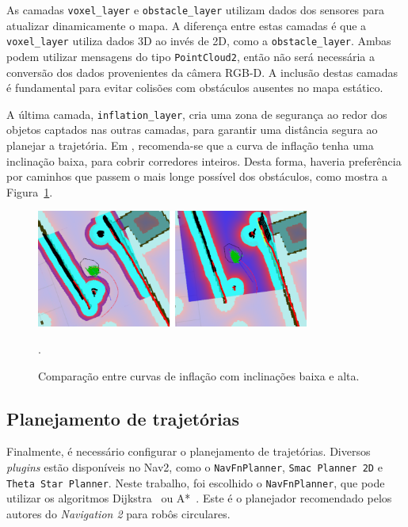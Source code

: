 \documentclass[repeatfields,xlists,xpacks,oneside,yearsonly]{ufrgscca}
\begin{document}
As camadas \texttt{voxel\_layer} e \texttt{obstacle\_layer} utilizam dados dos
sensores para atualizar dinamicamente o mapa.
A diferença entre estas camadas é que a \texttt{voxel\_layer} utiliza dados 3D
ao invés de 2D, como a \texttt{obstacle\_layer}. Ambas podem utilizar mensagens
do tipo \texttt{PointCloud2}, então não será necessária a conversão dos
dados provenientes da câmera RGB-D.
A inclusão destas camadas é fundamental para evitar colisões com obstáculos
ausentes no mapa estático.

A última camada, \texttt{inflation\_layer}, cria uma zona de segurança ao redor
dos objetos captados nas outras camadas, para garantir uma distância segura
ao planejar a trajetória.
Em \textcite{ros_tuning_guide}, recomenda-se que a curva de inflação tenha uma
inclinação baixa, para cobrir corredores inteiros.
Desta forma, haveria preferência por caminhos que passem o mais longe possível
dos obstáculos, como mostra a Figura~\ref{fig:inflation_layer}.

\begin{figure}[htbp]
    {
        \centering
        \caption{Comparação entre curvas de inflação com inclinações baixa e alta.}
        \label{fig:inflation_layer}
        \includegraphics[width=0.8\textwidth]{inflation_layer.png}\\
    }
    {.}
\end{figure}

\subsection{Planejamento de trajetórias}

Finalmente, é necessário configurar o planejamento de trajetórias.
Diversos \textit{plugins}  estão disponíveis no Nav2,
como o \texttt{NavFnPlanner}, \texttt{Smac Planner 2D} e \texttt{Theta Star Planner}.
Neste trabalho, foi escolhido o \texttt{NavFnPlanner}, que pode utilizar
os algoritmos Dijkstra~\cite{dijkstra} ou A*~\cite{astar}.
Este é o planejador recomendado pelos autores do \textit{Navigation 2}
para robôs circulares.
\end{document}
